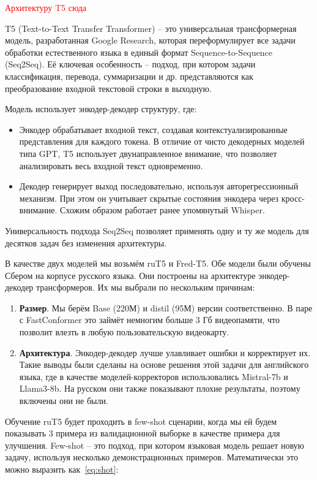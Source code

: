\textcolor{red}{Архитектуру T5 сюда}

T5 (Text-to-Text Transfer Transformer) -- это универсальная трансформерная модель, разработанная Google Research, которая переформулирует все задачи обработки естественного языка в единый формат Sequence-to-Sequence (Seq2Seq).
Её ключевая особенность -- подход, при котором задачи классификация, перевода, суммаризации и др. представляются как преобразование входной текстовой строки в выходную.

Модель использует энкодер-декодер структуру, где:
\begin{itemize}
  \item Энкодер обрабатывает входной текст, создавая контекстуализированные представления для каждого токена.
  В отличие от чисто декодерных моделей типа GPT, T5 использует двунаправленное внимание, что позволяет анализировать весь входной текст одновременно.
  \item Декодер генерирует выход последовательно, используя авторегрессионный механизм.
  При этом он учитывает скрытые состояния энкодера через кросс-внимание.
  Схожим образом работает ранее упомянутый Whisper.
\end{itemize}

Универсальность подхода Seq2Seq позволяет применять одну и ту же модель для десятков задач без изменения архитектуры.

В качестве двух моделей мы возьмём ruT5 и Fred-T5.
Обе модели были обучены Сбером на корпусе русского языка.
Они построены на архитектуре энкодер-декодер трансформеров.
Их мы выбрали по нескольким причинам:

\begin{enumerate}
  \item \textbf{Размер}.
  Мы берём Base (220М) и distil (95М) версии соответственно. 
  В паре с FastConformer это займёт немногим больше 3 Гб видеопамяти, что позволит влезть в любую пользовательскую видеокарту.
  \item \textbf{Архитектура}.
  Энкодер-декодер лучше улавливает ошибки и корректирует их.
  Такие выводы были сделаны на основе решения этой задачи для английского языка, где в качестве моделей-корректоров использовались Mistral-7b и Llama3-8b.
  На русском они также показывают плохие результаты, поэтому включены они не были.
\end{enumerate}

Обучение ruT5 будет проходить в few-shot сценарии, когда мы ей будем показывать 3 примера из валидационной выборке в качестве примера для улучшения.
Few-shot -- это подход, при котором языковая модель решает новую задачу, используя несколько демонстрационных примеров.
Математически это можно выразить как~\ref{eq:shot}:

